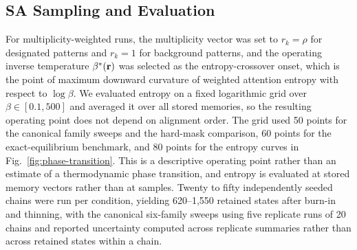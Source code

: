 \subsection{SA Sampling and Evaluation}

For multiplicity-weighted runs, the multiplicity vector was set to $r_k = \rho$ for designated
patterns and $r_k = 1$ for background patterns, and the operating inverse temperature
$\beta^{*}(\mathbf{r})$ was selected as the entropy-crossover onset, which is the point of maximum
downward curvature of weighted attention entropy with respect to $\log\beta$. We evaluated
entropy on a fixed logarithmic grid over $\beta\in[0.1,500]$ and averaged it over all stored
memories, so the resulting operating point does not depend on alignment order. The grid used 50 points
for the canonical family sweeps and the hard-mask comparison, 60 points for the exact-equilibrium
benchmark, and 80 points for the entropy curves in Fig.~\ref{fig:phase-transition}. This is a
descriptive operating point rather than an estimate of a thermodynamic phase transition, and
entropy is evaluated at stored memory vectors rather than at samples. Twenty to fifty independently seeded chains were run per
condition, yielding 620--1{,}550 retained states after burn-in and thinning, with the canonical
six-family sweeps using five replicate runs of 20 chains and reported uncertainty computed
across replicate summaries rather than across retained states within a chain.

